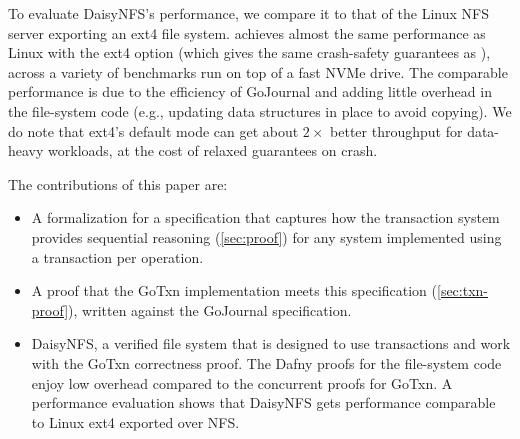 
To evaluate DaisyNFS's performance, we compare it to that of the Linux NFS server
exporting an ext4 file system. \sys achieves almost the same performance as
Linux with the ext4  option (which gives the same crash-safety
guarantees as \sys), across a variety of benchmarks run on top of a fast NVMe
drive. The comparable performance is due to the efficiency of GoJournal and
adding little overhead in the file-system code (e.g., updating data structures
in place to avoid copying). We do note that ext4's default 
mode can get about $2\times$ better throughput for data-heavy workloads, at the
cost of relaxed guarantees on crash.

The contributions of this paper are:
\begin{itemize}
  \item A formalization for a specification that captures how the transaction
  system provides sequential reasoning (\cref{sec:proof}) for any system
  implemented using a transaction per operation.
  \item A proof that the GoTxn implementation meets this specification
(\cref{sec:txn-proof}), written against the GoJournal specification.
  \item DaisyNFS, a verified file system that is designed to use transactions
  and work with the GoTxn correctness proof. The Dafny proofs for the
  file-system code enjoy low overhead compared to the concurrent proofs for GoTxn. A performance
  evaluation shows that DaisyNFS gets performance comparable to Linux ext4
  exported over NFS.
\end{itemize}

